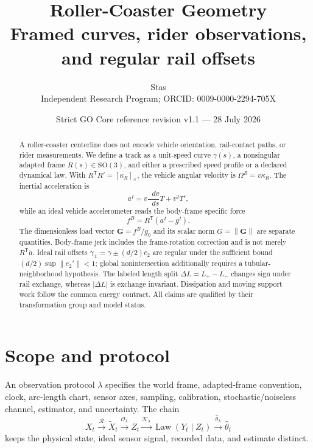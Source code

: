 \documentclass[11pt,a4paper]{article}
\title{\bfseries Roller-Coaster Geometry\\
\large Framed curves, rider observations, and regular rail offsets}
\author{Stas\\
\small Independent Research Program; ORCID: 0009-0000-2294-705X}
\date{Strict GO Core reference revision v1.1 --- 28 July 2026}
\theoremstyle{definition}
\theoremstyle{plain}
\theoremstyle{remark}
\newcommand{\dd}{\mathop{}\!d}
\newcommand{\norm}[1]{\left\lVert #1\right\rVert}
\newcommand{\SO}{\mathrm{SO}}
\newcommand{\Ocal}{\mathcal O}
\newcommand{\Kcal}{\mathcal K}
\newcommand{\Rcal}{\mathcal R}
\newcommand{\crossop}[1]{\left[#1\right]_\times}
\begin{document}
\maketitle

\begin{center}
\end{center}

\begin{abstract}
A roller-coaster centerline does not encode vehicle orientation,
rail-contact paths, or rider measurements. We define a track as a
unit-speed curve \(\gamma(s)\), a nonsingular adapted frame
\(R(s)\in\SO(3)\), and either a prescribed speed profile or a declared
dynamical law. With \(R^{\mathsf T}R'=\crossop{\kappa_R}\), the vehicle
angular velocity is \(\Omega^B=v\kappa_R\). The inertial acceleration
is
\[
a^I=v\frac{\dd v}{\dd s}T+v^2T',
\]
while an ideal vehicle accelerometer reads the body-frame specific
force
\[
f^B=R^{\mathsf T}(a^I-g^I).
\]
The dimensionless load vector
\(\bm G=f^B/g_0\) and its scalar norm \(G=\norm{\bm G}\) are separate
quantities. Body-frame jerk includes the frame-rotation correction and
is not merely \(R^{\mathsf T}\dot a\). Ideal rail offsets
\(\gamma_\pm=\gamma\pm(d/2)e_2\) are regular under the sufficient bound
\((d/2)\sup\norm{e_2'}<1\); global nonintersection additionally
requires a tubular-neighborhood hypothesis. The labeled length split
\(\Delta L=L_+-L_-\) changes sign under rail exchange, whereas
\(\lvert\Delta L\rvert\) is exchange invariant. Dissipation and moving
support work follow the common energy contract. All claims are
qualified by their transformation group and model status.
\end{abstract}

\tableofcontents

\section{Scope and protocol}

An observation protocol \(\lambda\) specifies the world frame,
adapted-frame convention, clock, arc-length chart, sensor axes,
sampling, calibration, stochastic/noiseless channel, estimator, and
uncertainty. The chain
\[
X_t\xrightarrow{\Rcal}\widetilde X_t
\xrightarrow{\Ocal_\lambda}Z_t
\xrightarrow{\Kcal_\lambda}\operatorname{Law}(Y_t\mid Z_t)
\xrightarrow{\widehat\theta_\lambda}\widehat\theta_t
\]
keeps the physical state, ideal sensor signal, recorded data, and
estimate distinct.
\end{document}
